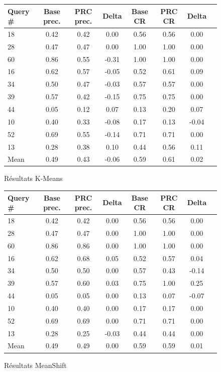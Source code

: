 \documentclass{article}
\begin{document}
\begin{figure}[H]
\begin{tabular}{l*{6}{c}r}
Query \# & Base prec. & PRC prec. & Delta  & Base CR & PRC CR & Delta\\ 
\hline
   18 &    0.42   &   0.42   &   0.00 &  0.56  & 0.56  &   0.00 \\
   28 &    0.47   &   0.47   &   0.00 &  1.00  & 1.00  &   0.00 \\
   60 &    0.86   &   0.55   &  -0.31 &  1.00  & 1.00  &   0.00 \\
   16 &    0.62   &   0.57   &  -0.05 &  0.52  & 0.61  &   0.09 \\
   34 &    0.50   &   0.47   &  -0.03 &  0.57  & 0.57  &   0.00 \\
   39 &    0.57   &   0.42   &  -0.15 &  0.75  & 0.75  &   0.00 \\
   44 &    0.05   &   0.12   &   0.07 &  0.13  & 0.20  &   0.07 \\
   10 &    0.40   &   0.33   &  -0.08 &  0.17  & 0.13  &  -0.04 \\
   52 &    0.69   &   0.55   &  -0.14 &  0.71  & 0.71  &   0.00 \\
   13 &    0.28   &   0.38   &   0.10 &  0.44  & 0.56  &   0.11 \\
\hline
Mean  &    0.49   &   0.43   &  -0.06 &  0.59  & 0.61  &   0.02 \\
\end{tabular}
\caption{Résultats K-Means}
\end{figure}

\begin{figure}[H]
\begin{tabular}{l*{6}{c}r}
Query \# & Base prec. & PRC prec. & Delta  & Base CR & PRC CR & Delta\\ 
\hline
   18 &    0.42   &   0.42   &   0.00 &  0.56  & 0.56  &   0.00 \\
   28 &    0.47   &   0.47   &   0.00 &  1.00  & 1.00  &   0.00 \\
   60 &    0.86   &   0.86   &   0.00 &  1.00  & 1.00  &   0.00 \\
   16 &    0.62   &   0.68   &   0.05 &  0.52  & 0.57  &   0.04 \\
   34 &    0.50   &   0.50   &   0.00 &  0.57  & 0.43  &  -0.14 \\
   39 &    0.57   &   0.60   &   0.03 &  0.75  & 1.00  &   0.25 \\
   44 &    0.05   &   0.05   &   0.00 &  0.13  & 0.07  &  -0.07 \\
   10 &    0.40   &   0.40   &   0.00 &  0.17  & 0.17  &   0.00 \\
   52 &    0.69   &   0.69   &   0.00 &  0.71  & 0.71  &   0.00 \\
   13 &    0.28   &   0.25   &  -0.03 &  0.44  & 0.44  &   0.00 \\
\hline
Mean  &    0.49   &   0.49   &   0.00 &  0.59  & 0.59  &   0.01 \\
\end{tabular}
\caption{Résultats MeanShift}
\end{figure}
\end{document}
